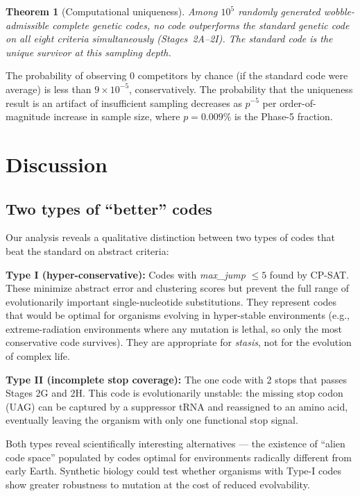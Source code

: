 \documentclass[10pt,twocolumn]{article}
\newtheorem{theorem}{Theorem}
\begin{document}
\begin{theorem}[Computational uniqueness]
Among $10^5$ randomly generated wobble-admissible complete genetic codes,
no code outperforms the standard genetic code on all eight criteria
simultaneously (Stages~2A--2I). The standard code is the unique survivor
at this sampling depth.
\end{theorem}

The probability of observing 0 competitors by chance (if the standard code
were average) is less than $9 \times 10^{-5}$, conservatively. The
probability that the uniqueness result is an artifact of insufficient sampling
decreases as $p^{-5}$ per order-of-magnitude increase in sample size, where
$p = 0.009\%$ is the Phase-5 fraction.

\section{Discussion}

\subsection{Two types of ``better'' codes}

Our analysis reveals a qualitative distinction between two types of codes
that beat the standard on abstract criteria:

\textbf{Type I (hyper-conservative):} Codes with \emph{max\_jump} $\leq 5$
found by CP-SAT. These minimize abstract error and clustering scores but
prevent the full range of evolutionarily important single-nucleotide substitutions.
They represent codes that would be optimal for organisms evolving in
hyper-stable environments (e.g., extreme-radiation environments where any
mutation is lethal, so only the most conservative code survives). They are
appropriate for \emph{stasis}, not for the evolution of complex life.

\textbf{Type II (incomplete stop coverage):} The one code with 2 stops that
passes Stages 2G and 2H. This code is evolutionarily unstable: the missing
stop codon (UAG) can be captured by a suppressor tRNA and reassigned to an
amino acid, eventually leaving the organism with only one functional stop signal.

Both types reveal scientifically interesting alternatives --- the existence of
``alien code space'' populated by codes optimal for environments radically
different from early Earth. Synthetic biology could test whether organisms with
Type-I codes show greater robustness to mutation at the cost of reduced
evolvability.
\end{document}
